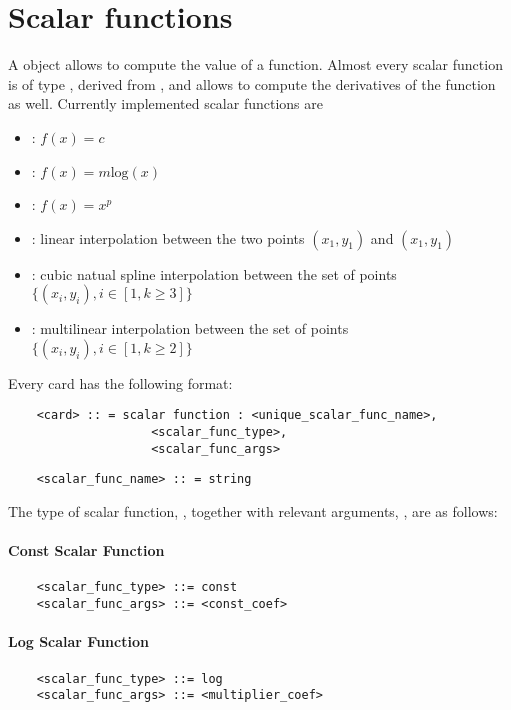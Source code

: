\chapter{Scalar functions}\label{sec:SCALARFUNCS}
A  object allows to compute the value of a function.
Almost every scalar function is of type ,
derived from , and allows to compute the derivatives of
the function as well. Currently implemented scalar functions are
\begin{itemize}
\item {}: $f(x)=c$
\item {}: $f(x)=m\textrm{log}(x)$
\item {}: $f(x)=x^p$
\item {}: linear interpolation between the two points $(x_1,y_1)$
and $(x_1,y_1)$
\item {}: cubic natual spline interpolation between the 
set of points $\{(x_i,y_i), i\in[1,k\geq3]\}$
\item {}: multilinear interpolation between the 
set of points $\{(x_i,y_i), i\in[1,k\geq2]\}$
\end{itemize}

\noindent
Every  card has the following format:
\begin{verbatim}
    <card> :: = scalar function : <unique_scalar_func_name>, 
                    <scalar_func_type>,
                    <scalar_func_args>
\end{verbatim}
\begin{verbatim}
    <scalar_func_name> :: = string 
\end{verbatim}

\noindent
The type of scalar function,
, together 
with relevant arguments, ,
are as follows:
\subsubsection{Const Scalar Function}
\begin{verbatim}
    <scalar_func_type> ::= const
    <scalar_func_args> ::= <const_coef>
\end{verbatim}
\subsubsection{Log Scalar Function}
\begin{verbatim}
    <scalar_func_type> ::= log
    <scalar_func_args> ::= <multiplier_coef>
\end{verbatim}
